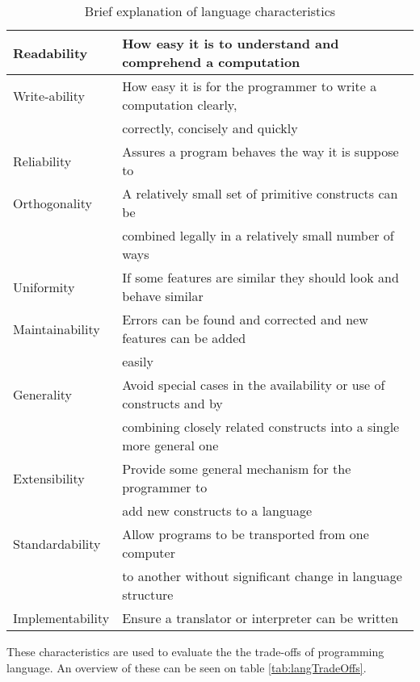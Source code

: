 \begin{table}[H]
	\begin{tabular}{|l|l|}
		\hline
		Readability & How easy it is to understand and comprehend a computation \\ \hline
		Write-ability & How easy it is for the programmer to write a computation clearly, \\
		~ & correctly, concisely and quickly \\ \hline
		Reliability & Assures a program behaves the way it is suppose to \\ \hline
		Orthogonality & A relatively small set of primitive constructs can be \\
		~ & combined legally in a relatively small number of ways \\ \hline		
		Uniformity & If some features are similar they should look and behave similar \\ \hline
		Maintainability & Errors can be found and corrected and new features can be added \\
		~ & easily \\ \hline
		Generality & Avoid special cases in the availability or use of constructs and by \\ 
		~ & combining closely related constructs into a single more general one \\ \hline
		Extensibility & Provide some general mechanism for the programmer to \\
		~ & add new constructs to a language \\ \hline
		Standardability & Allow programs to be transported from one computer \\
		~ & to another without significant change in language structure \\ \hline
		Implementability & Ensure a translator or interpreter can be written \\
		\hline
	\end{tabular}
	\caption{Brief explanation of language characteristics \citep{sebesta}}
	\label{tab:langCharacteristics}
\end{table}

These characteristics are used to evaluate the the trade-offs of programming language. An overview of these can be seen on table \ref{tab:langTradeOffs}.

